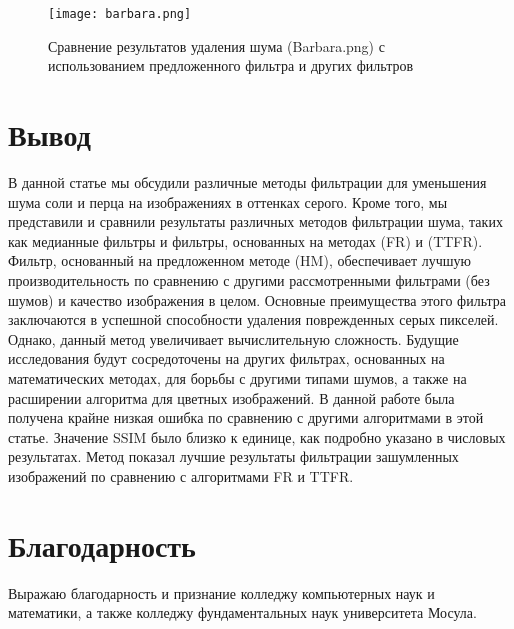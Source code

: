 \begin{figure}[H]
    \centering
    \texttt{[image: barbara.png]}
    \caption{Сравнение результатов удаления шума (Barbara.png) 
    с использованием предложенного фильтра и других фильтров}
\end{figure}

\section{Вывод}

В данной статье мы обсудили различные методы фильтрации для уменьшения шума соли
и перца на изображениях в оттенках серого. Кроме того, мы представили и сравнили
результаты различных методов фильтрации шума, таких как медианные фильтры и
фильтры, основанных на методах (FR) и (TTFR). Фильтр, основанный на предложенном
методе (HM), обеспечивает лучшую производительность по сравнению с другими
рассмотренными фильтрами (без шумов) и качество изображения в целом. Основные
преимущества этого фильтра заключаются в успешной способности удаления
поврежденных серых пикселей. Однако, данный метод увеличивает вычислительную
сложность. Будущие исследования будут сосредоточены на других фильтрах,
основанных на математических методах, для борьбы с другими типами шумов, а также
на расширении алгоритма для цветных изображений. В данной работе была получена
крайне низкая ошибка по сравнению с другими алгоритмами в этой статье. Значение
SSIM было близко к единице, как подробно указано в числовых результатах. Метод
показал лучшие результаты фильтрации зашумленных изображений по
сравнению с алгоритмами FR и TTFR.

\section{Благодарность}

Выражаю благодарность и признание колледжу компьютерных наук и математики, а
также колледжу фундаментальных наук университета Мосула.

\newpage
\printbibliography[heading=bibintoc]


